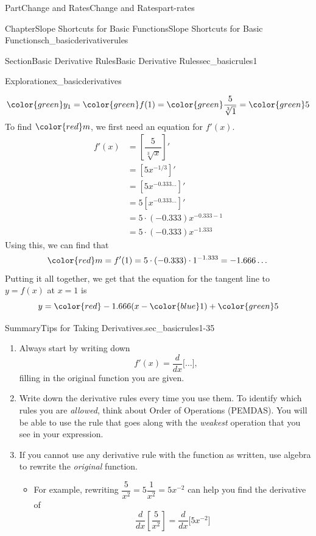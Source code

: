 \documentclass{tufte-book}
\numberwithin{equation}{chapter}
\newcommand{\red}[1]{   {\color{red}   #1}   }
\newcommand{\blue}[1]{  {\color{blue}  #1}  }
\newcommand{\green}[1]{ {\color{green} #1} }
\newcommand{\ddx}[1]{ \dfrac{d}{dx} \Big[ #1 \Big]  }
\newcommand{\ddxfrac}[1]{ \dfrac{d}{dx} \left[ #1 \right]  }
\newcommand{\amp}{&}
\begin{document}
\begin{partptx}{Part}{Change and Rates}{}{Change and Rates}{}{}{part-rates}
\begin{chapterptx}{Chapter}{Slope Shortcuts for Basic Functions}{}{Slope Shortcuts for Basic Functions}{}{}{ch_basicderivativerules}
\begin{sectionptx}{Section}{Basic Derivative Rules}{}{Basic Derivative Rules}{}{}{sec_basicrules1}
\begin{exploration}{Exploration}{}{ex_basicderivatives}
\begin{enumerate}[font=\bfseries,label=(\alph*),ref=\alph*]
\begin{equation*}
\green{ y_1} = \green{f(1)} = \green{\dfrac{5}{\sqrt[3]{1}}} = \green{5}
\end{equation*}
To find \(\red m\), we first need an equation for \(f'(x)\).%
\begin{align*}
f'(x) \amp  = \left[ \dfrac{5}{\sqrt[3]{x}} \right]'\\
\amp = [ 5x^{-1/3}]'\\
\amp = [5 x^{-0.333\dots}]'\\
\amp = 5 [ x^{-0.333\dots}]'\\
\amp = 5 \cdot (-0.333) x^{-0.333-1}\\
\amp = 5 \cdot (-0.333) x^{-1.333}
\end{align*}
Using this, we can find that%
\begin{equation*}
\red m = f'(1) = 5\cdot (-0.333)\cdot 1^{-1.333} = -1.666\dots
\end{equation*}
Putting it all together, we get that the equation for the tangent line to \(y = f(x)\) at \(x=1\) is%
\begin{equation*}
y = \red{-1.666} (x-\blue{1}) + \green{5}
\end{equation*}
%
\end{enumerate}%
\end{exploration}%
\begin{assemblage}{Summary}{Tips for Taking Derivatives.}{sec_basicrules1-35}%
%
\begin{enumerate}
\item{}Always start by writing down%
\begin{equation*}
f'(x) = \ddx{\dots}\text{,}
\end{equation*}
filling in the original function you are given.%
\item{}Write down the derivative rules every time you use them.  To identify which rules you are \emph{allowed}, think about Order of Operations (PEMDAS).  You will be able to use the rule that goes along with the \emph{weakest} operation that you see in your expression.%
\item{}If you cannot use any derivative rule with the function as written, use algebra to rewrite the \emph{original} function.%
%
\begin{itemize}[label=\textbullet]
\item{}For example, rewriting \(\dfrac{5}{x^2} = 5\dfrac{1}{x^2} = 5x^{-2}\) can help you find the derivative of%
\begin{equation*}
\ddxfrac{\dfrac{5}{x^2}} = \ddx{5x^{-2}}
\end{equation*}

\end{itemize}
\end{enumerate}
\end{assemblage}
\end{sectionptx}
\end{chapterptx}
\end{partptx}
\end{document}
